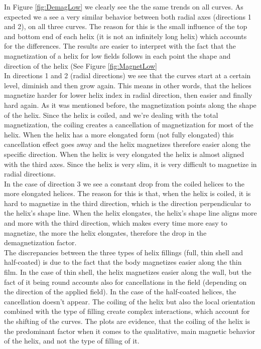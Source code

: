 In Figure \ref{fig:DemagLow} we clearly see the the same trends on all curves. As expected we a see a very similar behavior between both radial axes (directions 1 and 2), on all three curves. The reason for this is the small influence of the top and bottom end of each helix (it is not an infinitely long helix) which accounts for the differences. 
The results are easier to interpret with the fact that the magnetization of a helix for low fields follows in each point the shape and direction of the helix (See Figure \ref{fig:MagnetLow}\\

In directions 1 and 2 (radial directions) we see that the curves start at a certain level, diminish and then grow again. This means in other words, that the helices magnetize harder for lower helix index in radial direction, then easier and finally hard again. As it was mentioned before, the magnetization points along the shape of the helix. Since the helix is coiled, and we're dealing with the total magnetization, the coiling creates a cancellation of magnetization for most of the helix. When the helix has a more elongated form (not fully elongated) this cancellation effect goes away and the helix magnetizes therefore easier along the specific direction. When the helix is very elongated the helix is almost aligned with the third axes. Since the helix is very slim, it is very difficult to magnetize in radial directions.\\

In the case of direction 3 we see a constant drop from the coiled helices to the more elongated helices. The reason for this is that, when the helix is coiled, it is hard to magnetize in the third direction, which is the direction perpendicular to the helix's shape line. When the helix elongates, the helix's shape line aligns more and more with the third direction, which makes every time more easy to magnetize, the more the helix elongates, therefore the drop in the demagnetization factor.\\

The discrepancies between the three types of helix fillings (full, thin shell and half-coated) is due to the fact that the body magnetizes easier along the thin film. In the case of thin shell, the helix magnetizes easier along the wall, but the fact of it being round accounts also for cancellations in the field (depending on the direction of the applied field). In the case of the half-coated helices, the cancellation doesn't appear. The coiling of the helix but also the local orientation combined with the type of filling create complex interactions, which account for the shifting of the curves. The plots are evidence, that the coiling of the helix is the predominant factor when it comes to the qualitative, main magnetic behavior of the helix, and not the type of filling of it. \\

